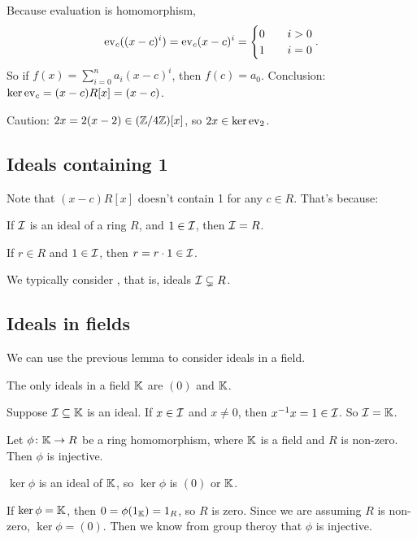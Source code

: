 \documentclass[12pt,letterpaper]{report}
\begin{document}
Because evaluation is homomorphism,
\[
  \operatorname{ev}_c((x - c)^i) = \operatorname{ev}_c(x - c)^i = \begin{cases}
    0 \quad & i > 0 \\
    1 & i = 0
  \end{cases}.
\]
So if $f(x) = \sum_{i = 0}^n a_i (x - c)^i$, then $f(c) = a_0$.
Conclusion: $\ker\operatorname{ev}_c = (x - c)R[x] = (x - c)$.

Caution: $2x = 2(x - 2) \in (\mathbb{Z}/{4}\mathbb{Z})[x]$, so $2x \in \ker\operatorname{ev}_2$.

\pagebreak
\subsection{Ideals containing 1}

Note that $(x - c)R[x]$ doesn't contain 1 for any $c \in R$.
That's because:

\begin{lem}{}{}
  If $\mathcal{I}$ is an ideal of a ring $R$, and $1 \in \mathcal{I}$, then $\mathcal{I} = R$.
\end{lem}

\begin{thmproof}
  If $r \in R$ and $1 \in \mathcal{I}$, then $r = r \cdot 1 \in \mathcal{I}$.
\end{thmproof}

We typically consider , that is, ideals $\mathcal{I} \subsetneq R$.

\pagebreak
\subsection{Ideals in fields}

We can use the previous lemma to consider ideals in a field.

\begin{cor}{}{}
  The only ideals in a field $\mathbb{K}$ are $(0)$ and $\mathbb{K}$.
\end{cor}

\begin{thmproof}
  Suppose $\mathcal{I} \subseteq \mathbb{K}$ is an ideal.
  If $x \in \mathcal{I}$ and $x \neq 0$, then $x^{-1}x = 1 \in \mathcal{I}$.
  So $\mathcal{I} = \mathbb{K}$.
\end{thmproof}

\begin{cor}{}{}
  Let $\phi \colon \mathbb{K} \to R$ be a ring homomorphism, where $\mathbb{K}$ is a field and $R$
  is non-zero.
  Then $\phi$ is injective.
\end{cor}

\begin{thmproof}
  $\ker\phi$ is an ideal of $\mathbb{K}$, so $\ker\phi$ is $(0)$ or $\mathbb{K}$.

  If $\ker\phi = \mathbb{K}$, then $0 = \phi(1_{\mathbb{K}}) = 1_R$, so $R$ is zero.
  Since we are assuming $R$ is non-zero, $\ker\phi = (0)$.
  Then we know from group theroy that $\phi$ is injective.
\end{thmproof}
\end{document}
